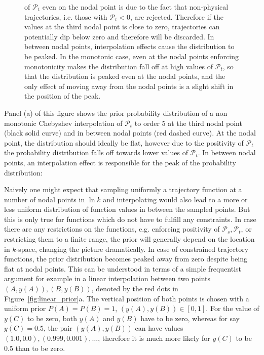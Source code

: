 \documentclass[a4paper,11pt]{article}
\newcommand{\pscalar}{{\mathcal{P}_s}}
\newcommand{\ptensor}{{\mathcal{P}_t}}
\begin{document}
\begin{figure}
{    of $\ptensor$ even on the nodal point is due to the fact that
    non-physical trajectories, i.e. those with $\ptensor<0$, are
    rejected. Therefore if the values at the third nodal point is
    close to zero, trajectories can potentially dip below zero and
    therefore will be discarded. In between nodal points,
    interpolation effects cause the distribution to be peaked. In the
    monotonic case, even at the nodal points enforcing monotonicity
    makes the distribution fall off at high values of $\ptensor$,
    so that the distribution is peaked even at the nodal points, and
    the only effect of moving away from the nodal points is a slight
    shift in the position of the peak.}
  \label{fig:prior_distribution}
\end{figure}
Panel (a) of this figure shows the prior probability distribution of a
non monotonic Chebyshev interpolation of $\ptensor$ to order $5$
at the third nodal point (black solid curve) and in between nodal
points (red dashed curve). At the nodal point, the distribution should
ideally be flat, however due to the positivity of $\ptensor$ the
probability distribution falls off towards lower values of
$\ptensor$. In between nodal points, an interpolation effect is
responsible for the peak of the probability distribution:

Naively one might expect that sampling uniformly a trajectory function
at a number of nodal points in $\ln k$ and interpolating would also
lead to a more or less uniform distribution of function values in
between the sampled points. But this is only true for functions which
do not have to fulfill any constraints. In case there are any
restrictions on the functions, e.g. enforcing positivity of
$\pscalar, \ptensor$, or restricting them to a finite range,
the prior will generally depend on the location in $k$-space, changing
the picture dramatically. In case of constrained trajectory functions,
the prior distribution becomes peaked away from zero despite being
flat at nodal points. This can be understood in terms of a simple
frequentist argument for example in a linear interpolation between two
points $(A, y(A)), (B, y(B))$, denoted by the red dots in
Figure~\ref{fig:linear_prior}a. The vertical position of both points is
chosen with a uniform prior $P(A)=P(B)=1$, $(y(A),y(B)) \in [0,1]$.
For the value of $y(C)$ to be zero, both $y(A)$ and $y(B)$ have to be
zero, whereas for say $y(C)=0.5$, the pair $(y(A), y(B))$ can have
values $(1.0,0.0), (0.999,0.001),\dots$, therefore it is much more
likely for $y(C)$ to be $0.5$ than to be zero.
\end{document}

